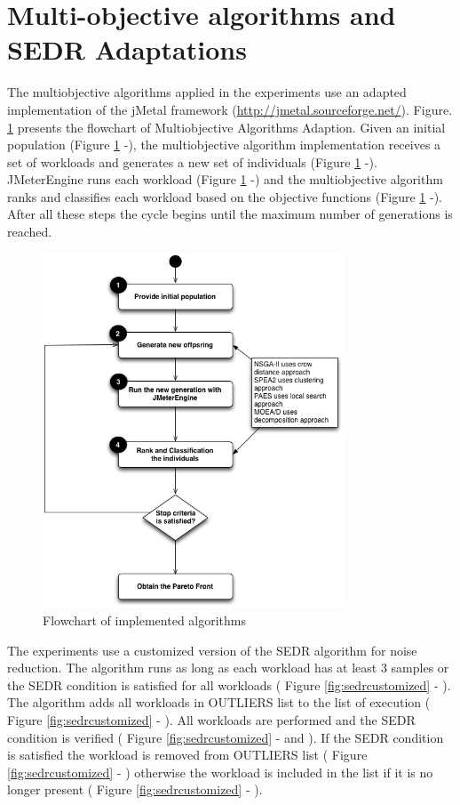 \documentclass[espaco=umemeio,chapter=TITLE,twoside,openright]{abnt}
\begin{document}
\section{Multi-objective algorithms and SEDR Adaptations}

The multiobjective algorithms applied in the experiments use an adapted implementation of the jMetal framework (\url{http://jmetal.sourceforge.net/}). Figure. \ref{fig:flowchart} presents the flowchart of  Multiobjective Algorithms Adaption. Given an initial population (Figure \ref{fig:flowchart}  -),  the multiobjective algorithm implementation receives a set of workloads  and generates a new set of individuals  (Figure \ref{fig:flowchart}  -).  JMeterEngine runs each workload (Figure \ref{fig:flowchart}  -) and the multiobjective algorithm ranks and classifies each workload based on the objective functions  (Figure \ref{fig:flowchart}  -).  After all these steps the cycle begins until the maximum number of generations is reached.

\begin{figure}[!h]
\centering
\includegraphics[width=0.8\textwidth]{./images/step3.png}
\caption{Flowchart of implemented algorithms}
\label{fig:flowchart}
\end{figure}

The experiments use a customized version of the SEDR algorithm for noise reduction. The algorithm runs as long as each workload has at least 3 samples or the SEDR condition is satisfied for all workloads ( Figure \ref{fig:sedrcustomized} - ). The algorithm adds all workloads in OUTLIERS list to the list of execution ( Figure \ref{fig:sedrcustomized} - ). All workloads are performed and the SEDR condition is verified  ( Figure \ref{fig:sedrcustomized} -  and  ). If the SEDR condition is satisfied the workload is removed from OUTLIERS list ( Figure \ref{fig:sedrcustomized} - ) otherwise the workload is included in the list if it is no longer present ( Figure \ref{fig:sedrcustomized} - ). 
\end{document}
